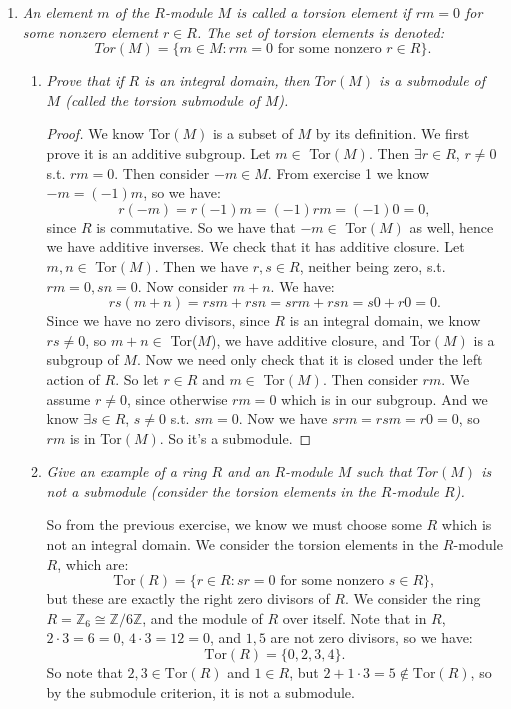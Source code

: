\documentclass[9pt,reqno,twoside]{amsbook}
\theoremstyle{plain}
\numberwithin{section}{chapter}
\numberwithin{equation}{chapter}
\theoremstyle{definition}
\theoremstyle{remark}
\theoremstyle{plain}
\newcommand{\z}{\mathbb{Z}}
\begin{document}
\begin{enumerate}[label=\arabic*.]
\item \textit{An element $m$ of the $R$-module $M$ is called a torsion element if $rm = 0$ for some nonzero element $r \in R$. The set of torsion elements is denoted: } \label{ex10.1.8}
$$
Tor(M) = \{m \in M:rm = 0 \text{ for some nonzero } r \in R\}. 
$$

\begin{enumerate}
\item \textit{Prove that if $R$ is an integral domain, then $Tor(M)$ is a submodule of $M$ (called the torsion submodule of $M$). }
\begin{proof}
We know Tor$(M)$ is a subset of $M$ by its definition. We first prove it is an additive subgroup. Let $m \in $ Tor$(M)$. Then $\exists r \in R$, $r \neq 0$ s.t. $rm = 0$. Then consider $-m \in M$. From exercise 1 we know 
$
-m = (-1)m$, so we have:
$$
r(-m) = r(-1)m = (-1)rm = (-1)0 = 0,
$$
 since $R$ is commutative. So we have that $-m \in $ Tor$(M)$ as well, hence we have additive inverses. We check that it has additive closure. Let $m,n \in $ Tor$(M)$. Then we have $r,s \in R$, neither being zero, s.t. $rm = 0, sn = 0$. Now consider $m + n$. We have:
$$
rs(m + n) = rsm + rsn = srm + rsn = s0 + r0 = 0.
$$
Since we have no zero divisors, since $R$ is an integral domain, we know $rs \neq 0$, so $m  +n \in $ Tor($M$), we have additive closure, and Tor$(M)$ is a subgroup of $M$. Now we need only check that it is closed under the left action of $R$. So let $r \in R$ and $m \in $ Tor$(M)$. Then consider $rm$. We assume $r \neq 0$, since otherwise $rm = 0$ which is in our subgroup. And we know $\exists s \in R$, $s \neq 0$ s.t. $sm = 0$. Now we have $srm = rsm = r0 = 0$, so $rm$ is in Tor$(M)$. So it's a submodule. 
\end{proof}

\vspace{3mm}
\item \textit{Give an example of a ring $R$ and an $R$-module $M$ such that $Tor(M)$ is not a submodule (consider the torsion elements in the $R$-module $R$). }

So from the previous exercise, we know we must choose some $R$ which is not an integral domain. We consider the torsion elements in the $R$-module $R$, which are:
$$
\text{Tor}(R) = \{r \in R: sr = 0 \text{ for some nonzero }s \in R\},
$$
but these are exactly the right zero divisors of $R$. We consider the ring $R = \mathbb{Z}_6 \cong \z/6\z$, and the module of $R$ over itself. Note that in $R$, $2 \cdot 3 = 6 = 0$, $4\cdot 3 = 12 = 0$, and $1,5$ are not zero divisors, so we have:
$$
\text{Tor}(R) = \{0,2,3,4\}.
$$
So note that $2,3\in \text{Tor}(R)$ and $1 \in R$, but $2 + 1\cdot 3 = 5 \notin \text{Tor}(R)$, so by the submodule criterion, it is not a submodule. 


\end{enumerate}
\end{enumerate}
\end{document}
